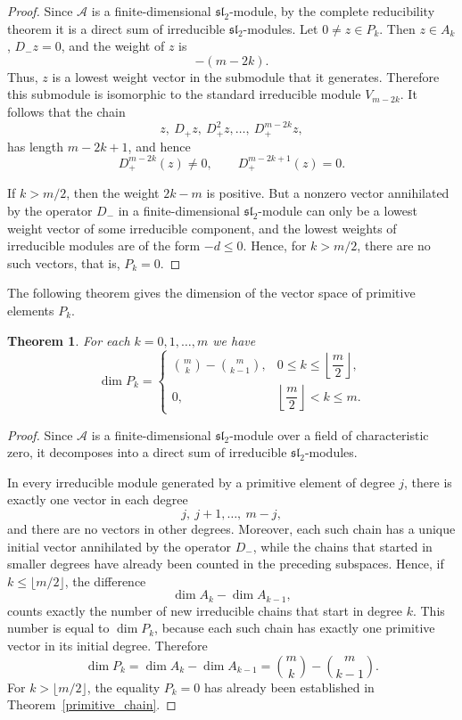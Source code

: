 \documentclass[10pt,a4paper]{amsart}
\newtheorem{theorem}{Theorem}[section]
\begin{document}
\begin{proof}
Since $\mathcal A$ is a finite-dimensional $\mathfrak{sl}_2$-module, by the
complete reducibility theorem it is a direct sum of irreducible
$\mathfrak{sl}_2$-modules. Let $0\neq z\in P_k$. Then $z\in A_k$,
$D_-z=0$, and the weight of $z$ is
$$
-(m-2k).
$$
Thus, $z$ is a lowest weight vector in the submodule that it generates.
Therefore this submodule is isomorphic to the standard irreducible module
$V_{m-2k}$. It follows that the chain
$$
z,\ D_+z,\ D_+^2z,\dots,\ D_+^{m-2k}z,
$$
has length $m-2k+1$, and hence
$$
D_+^{m-2k}(z)\neq 0,
\qquad
D_+^{m-2k+1}(z)=0.
$$

If $k>m/2$, then the weight $2k-m$ is positive. But a nonzero vector
annihilated by the operator $D_-$ in a finite-dimensional
$\mathfrak{sl}_2$-module can only be a lowest weight vector of some
irreducible component, and the lowest weights of irreducible modules are of
the form $-d\le 0$. Hence, for $k>m/2$, there are no such vectors, that is,
$P_k=0$.
\end{proof}

The following theorem gives the dimension of the vector space of primitive
elements $P_k$.

\begin{theorem}\label{primitive_dimensions}
For each $k=0,1,\dots,m$ we have
$$
\dim P_k=
\begin{cases}
\displaystyle \binom{m}{k}-\binom{m}{k-1},
& 0\le k\le \left\lfloor \dfrac m2\right\rfloor,\\[8pt]
0,
& \left\lfloor \dfrac m2\right\rfloor<k\le m.
\end{cases}
$$
\end{theorem}

\begin{proof}
Since $\mathcal A$ is a finite-dimensional $\mathfrak{sl}_2$-module over a
field of characteristic zero, it decomposes into a direct sum of irreducible
$\mathfrak{sl}_2$-modules.

In every irreducible module generated by a primitive element of degree $j$,
there is exactly one vector in each degree
$$
j,\ j+1,\dots,\ m-j,
$$
and there are no vectors in other degrees. Moreover, each such chain has a
unique initial vector annihilated by the operator $D_-$, while the chains that
started in smaller degrees have already been counted in the preceding
subspaces. Hence, if $k\le \lfloor m/2\rfloor$, the difference
$$
\dim A_k-\dim A_{k-1},
$$
counts exactly the number of new irreducible chains that start in degree
$k$. This number is equal to $\dim P_k$, because each such chain has exactly
one primitive vector in its initial degree.
Therefore
$$
\dim P_k
=
\dim A_k-\dim A_{k-1}
=
\binom{m}{k}-\binom{m}{k-1}.
$$
For $k>\lfloor m/2\rfloor$, the equality $P_k=0$ has already been established
in Theorem~\ref{primitive_chain}.
\end{proof}
\end{document}
